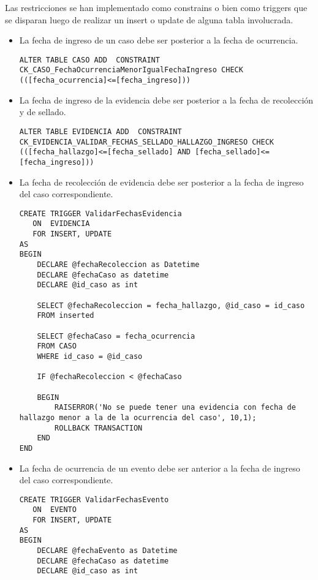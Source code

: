 \noindent Las restricciones se han implementado como constrains o bien como triggers que se disparan luego de realizar un insert o update de alguna tabla involucrada.\\

\begin{itemize}

\item La fecha de ingreso de un caso debe ser posterior a la fecha de ocurrencia.\\
\begin{lstlisting}
ALTER TABLE CASO ADD  CONSTRAINT CK_CASO_FechaOcurrenciaMenorIgualFechaIngreso CHECK  (([fecha_ocurrencia]<=[fecha_ingreso]))
\end{lstlisting}

\item La fecha de ingreso de la evidencia debe ser posterior a la fecha de recolección y de sellado.\\
\begin{lstlisting}
ALTER TABLE EVIDENCIA ADD  CONSTRAINT CK_EVIDENCIA_VALIDAR_FECHAS_SELLADO_HALLAZGO_INGRESO CHECK  (([fecha_hallazgo]<=[fecha_sellado] AND [fecha_sellado]<=[fecha_ingreso]))
\end{lstlisting}

\item La fecha de recolección de evidencia debe ser posterior a la fecha de ingreso del caso correspondiente.\\
\begin{lstlisting}
CREATE TRIGGER ValidarFechasEvidencia
   ON  EVIDENCIA
   FOR INSERT, UPDATE
AS 
BEGIN	
	DECLARE @fechaRecoleccion as Datetime
	DECLARE @fechaCaso as datetime	
	DECLARE @id_caso as int

    SELECT @fechaRecoleccion = fecha_hallazgo, @id_caso = id_caso
	FROM inserted

	SELECT @fechaCaso = fecha_ocurrencia
	FROM CASO
	WHERE id_caso = @id_caso

	IF @fechaRecoleccion < @fechaCaso

	BEGIN
		RAISERROR('No se puede tener una evidencia con fecha de hallazgo menor a la de la ocurrencia del caso', 10,1);
		ROLLBACK TRANSACTION
	END
END
\end{lstlisting}

\item La fecha de ocurrencia de un evento debe ser anterior a la fecha de ingreso del caso correspondiente.\\
\begin{lstlisting}
CREATE TRIGGER ValidarFechasEvento
   ON  EVENTO
   FOR INSERT, UPDATE
AS 
BEGIN	
	DECLARE @fechaEvento as Datetime
	DECLARE @fechaCaso as datetime	
	DECLARE @id_caso as int


\end{lstlisting}
\end{itemize}
